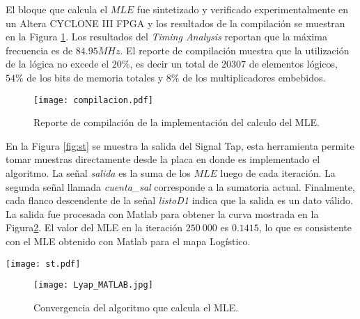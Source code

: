 El bloque que calcula el $MLE$ fue sintetizado y verificado experimentalmente en un Altera CYCLONE III FPGA y los resultados de la compilación se muestran en la Figura \ref{fig:compilacion}.
Los resultados del \textit{Timing Analysis} reportan que la máxima frecuencia es de $84.95MHz$.
El reporte de compilación muestra que la utilización de la lógica no excede el $20\%$, es decir un total de $20307$ de elementos lógicos, $54\%$ de los bits de memoria totales y $8\%$ de los multiplicadores embebidos.
%
\begin{figure}
	\centering
	\texttt{[image: compilacion.pdf]}\\
	\caption{Reporte de compilación de la implementación del calculo del MLE.}\label{fig:compilacion}
\end{figure}

En la Figura \ref{fig:st} se muestra la salida del Signal Tap, esta herramienta permite tomar muestras directamente desde la placa en donde es implementado el algoritmo.
La señal \textit{salida} es la suma de los $MLE$ luego de cada iteración.
La segunda señal llamada \textit{cuenta\_sal} corresponde a la sumatoria actual.
Finalmente, cada flanco descendente de la señal \textit{listoD1} indica que la salida es un dato válido.
La salida fue procesada con Matlab para obtener la curva mostrada en la Figura\ref{fig:lyapu}.
El valor del MLE en la iteración $250~000$ es $0.1415$, lo que es consistente con el MLE obtenido con Matlab para el mapa Logístico.
%
\begin{figure*}
	\centering
	\texttt{[image: st.pdf]}\\
	\caption{Salida del Signal Tap.}\label{fig:st}
\end{figure*}
%
\begin{figure}
	\centering
	\texttt{[image: Lyap\_MATLAB.jpg]}\\
	\caption{Convergencia del algoritmo que calcula el MLE.}\label{fig:lyapu}
\end{figure}